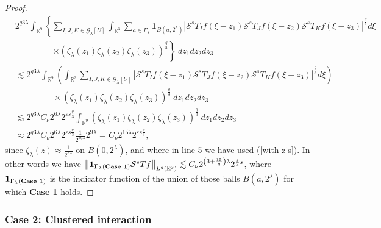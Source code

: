 \documentclass{amsart}%
\theoremstyle{plain}
\numberwithin{equation}{section}
\begin{document}
\begin{proof}
\begin{align*}
&  2^{q3\lambda}\int_{\mathbb{R}^{9}}\left\{  \sum_{I,J,K\in\mathcal{G}%
_{\lambda}\left[  U\right]  }\int_{\mathbb{R}^{3}}\sum_{a\in\Gamma_{\lambda}%
}\mathbf{1}_{B\left(  a,2^{\lambda}\right)  }\left\vert \mathcal{S}^{s}%
T_{I}f\left(  \xi-z_{1}\right)  \mathcal{S}^{s}T_{J}f\left(  \xi-z_{2}\right)
\mathcal{S}^{s}T_{K}f\left(  \xi-z_{3}\right)  \right\vert ^{\frac{q}{3}}%
d\xi\right. \\
&  \ \ \ \ \ \ \ \ \ \ \ \ \ \ \ \ \ \ \ \ \left.  \times\left(
\zeta_{\lambda}\left(  z_{1}\right)  \zeta_{\lambda}\left(  z_{2}\right)
\zeta_{\lambda}\left(  z_{3}\right)  \right)  ^{\frac{q}{3}}\right\}
\ dz_{1}dz_{2}dz_{3}\\
&  \lesssim2^{q3\lambda}\int_{\mathbb{R}^{9}}\left(  \int_{\mathbb{R}^{3}}%
\sum_{I,J,K\in\mathcal{G}_{\lambda}\left[  U\right]  }\left\vert
\mathcal{S}^{s}T_{I}f\left(  \xi-z_{1}\right)  \mathcal{S}^{s}T_{J}f\left(
\xi-z_{2}\right)  \mathcal{S}^{s}T_{K}f\left(  \xi-z_{3}\right)  \right\vert
^{\frac{q}{3}}d\xi\right) \\
&  \ \ \ \ \ \ \ \ \ \ \ \ \ \ \ \ \ \ \ \ \times\left(  \zeta_{\lambda
}\left(  z_{1}\right)  \zeta_{\lambda}\left(  z_{2}\right)  \zeta_{\lambda
}\left(  z_{3}\right)  \right)  ^{\frac{q}{3}}\ dz_{1}dz_{2}dz_{3}\\
&  \lesssim2^{q3\lambda}C_{\nu}2^{6\lambda}2^{\varepsilon s\frac{q}{3}}%
\int_{\mathbb{R}^{9}}\left(  \zeta_{\lambda}\left(  z_{1}\right)
\zeta_{\lambda}\left(  z_{2}\right)  \zeta_{\lambda}\left(  z_{3}\right)
\right)  ^{\frac{q}{3}}\ dz_{1}dz_{2}dz_{3}\\
&  \approx2^{q3\lambda}C_{\nu}2^{6\lambda}2^{\varepsilon s\frac{q}{3}}\frac
{1}{2^{3q\lambda}}2^{9\lambda}=C_{\nu}2^{15\lambda}2^{\varepsilon s\frac{q}%
{3}},
\end{align*}
since $\zeta_{\lambda}\left(  z\right)  \approx\frac{1}{2^{3\lambda}}$ on
$B\left(  0,2^{\lambda}\right)  $, and where in line 5 we have used
(\ref{with z's}). In other words we have $\left\Vert \mathbf{1}_{\Gamma
_{\lambda}\left(  \text{\textbf{Case 1}}\right)  }\mathcal{S}^{s}Tf\right\Vert
_{L^{q}\left(  \mathbb{R}^{3}\right)  }\lesssim C_{\nu}2^{\left(  3+\frac
{15}{q}\right)  \lambda}2^{\frac{\varepsilon}{3}s}$, where $\mathbf{1}%
_{\Gamma_{\lambda}\left(  \text{\textbf{Case 1}}\right)  }$ is the indicator
function of the union of those balls $B\left(  a,2^{\lambda}\right)  $ for
which \textbf{Case 1} holds.
\end{proof}

\subsubsection{Case 2: Clustered interaction\label{Sub Case 2}}
\end{document}
